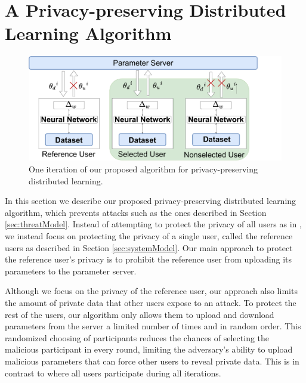 \documentclass[conference]{IEEEtran}
\begin{document}
\section{A Privacy-preserving Distributed Learning Algorithm}
\begin{figure}[t]
\includegraphics[width=\textwidth, keepaspectratio]{OurHighLevelApproach}
\caption{One iteration of our proposed algorithm for privacy-preserving distributed learning.}
\label{fig:HighLevel}
\end{figure}
In this section we describe our proposed privacy-preserving distributed learning algorithm, which prevents attacks
such as the ones described in Section \ref{sec:threatModel}. Instead of attempting to protect the privacy of all users as in 
\cite{shokri2015privacy}, we instead focus on protecting the privacy of a single user, called the reference users as described in
Section \ref{sec:systemModel}. Our main approach to protect the reference user's privacy is to prohibit the reference user
from uploading its parameters to the  parameter server. 

Although we focus on the privacy of the reference user, our approach also
limits the amount of private data that other users expose to an attack. To protect the rest of the users, our algorithm only allows
them to upload and download parameters from the server a limited number of times and in random order. 
This randomized choosing of participants reduces the chances of selecting the malicious participant in every round, limiting
the adversary's ability to upload malicious parameters that can force other users to reveal private data. 
This is in contrast to \cite{shokri2015privacy} where all users participate during all iterations. 

\end{document}
